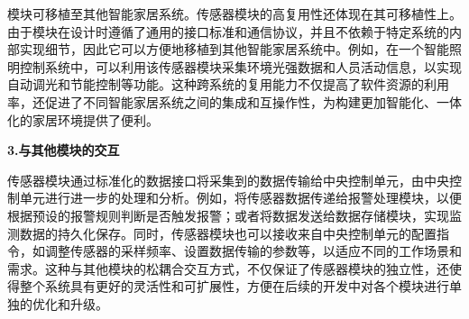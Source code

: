 模块可移植至其他智能家居系统。传感器模块的高复用性还体现在其可移植性上。由于模块在设计时遵循了通用的接口标准和通信协议，并且不依赖于特定系统的内部实现细节，因此它可以方便地移植到其他智能家居系统中。例如，在一个智能照明控制系统中，可以利用该传感器模块采集环境光强数据和人员活动信息，以实现自动调光和节能控制等功能。这种跨系统的复用能力不仅提高了软件资源的利用率，还促进了不同智能家居系统之间的集成和互操作性，为构建更加智能化、一体化的家居环境提供了便利。

\textbf{3.与其他模块的交互}

传感器模块通过标准化的数据接口将采集到的数据传输给中央控制单元，由中央控制单元进行进一步的处理和分析。例如，将传感器数据传递给报警处理模块，以便根据预设的报警规则判断是否触发报警；或者将数据发送给数据存储模块，实现监测数据的持久化保存。同时，传感器模块也可以接收来自中央控制单元的配置指令，如调整传感器的采样频率、设置数据传输的参数等，以适应不同的工作场景和需求。这种与其他模块的松耦合交互方式，不仅保证了传感器模块的独立性，还使得整个系统具有更好的灵活性和可扩展性，方便在后续的开发中对各个模块进行单独的优化和升级。